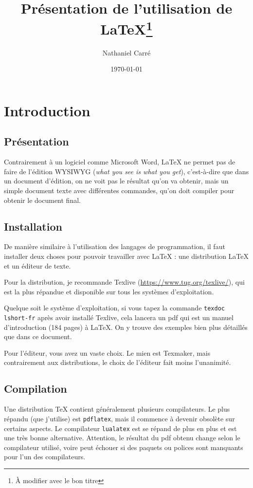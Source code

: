 \documentclass[12pt]{article} %
\theoremstyle{definition}
\theoremstyle{remark}
\begin{document}
\title{Présentation de l'utilisation de \LaTeX{}\footnote{À modifier avec le bon titre}}
\date{\today}
\author{Nathaniel Carré}

\maketitle

\section{Introduction}

\subsection{Présentation}

Contrairement à un logiciel comme Microsoft Word, \LaTeX{} ne permet pas de faire de l'édition WYSIWYG (\textit{what you see is what you get}), c'est-à-dire que dans un document d'édition, on ne voit pas le résultat qu'on va obtenir, mais un simple document texte avec différentes commandes, qu'on doit compiler pour obtenir le document final.

\subsection{Installation}

De manière similaire à l'utilisation des langages de programmation, il faut installer deux choses pour pouvoir travailler avec \LaTeX{} : une distribution \LaTeX{} et un éditeur de texte.

Pour la distribution, je recommande Texlive (\url{https://www.tug.org/texlive/}), qui est la plus répandue et disponible sur tous les systèmes d'exploitation.

Quelque soit le système d'exploitation, si vous tapez la commande \verb"texdoc lshort-fr" après avoir installé Texlive, cela lancera un pdf qui est un manuel d'introduction (184 pages) à \LaTeX{}. On y trouve des exemples bien plus détaillés que dans ce document.

Pour l'éditeur, vous avez un vaste choix. Le mien est Texmaker, mais contrairement aux distributions, le choix de l'éditeur fait moins l'unanimité.

\subsection{Compilation}

Une distribution \TeX{} contient généralement plusieurs compilateurs. Le plus répandu (que j'utilise) est \verb"pdflatex", mais il commence à devenir obsolète sur certains aspects. Le compilateur \verb"lualatex" est se répand de plus en plus et est une très bonne alternative. Attention, le résultat du pdf obtenu change selon le compilateur utilisé, voire peut échouer si des paquets ou polices sont manquants pour l'un des compilateurs.
\end{document}

